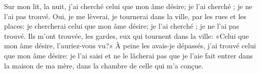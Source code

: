 Sur mon lit, la nuit, j’ai cherché celui que mon âme désire;
	je l’ai cherché ; je ne l’ai pas trouvé.
Oui, je me lèverai, je tournerai dans la ville, par les rues et les places:
	je chercherai celui que mon âme désire;
	je l’ai cherché ; je ne l’ai pas trouvé.
Ils m’ont trouvée, les gardes, eux qui tournent dans la ville:
	«Celui que mon âme désire, l’auriez-vous vu?»
À peine les avais-je dépassés, j’ai trouvé celui que mon âme désire:
	je l’ai saisi et ne le lâcherai pas
		que je l’aie fait entrer dans la maison de ma mère,
	dans la chambre de celle qui m’a conçue.
